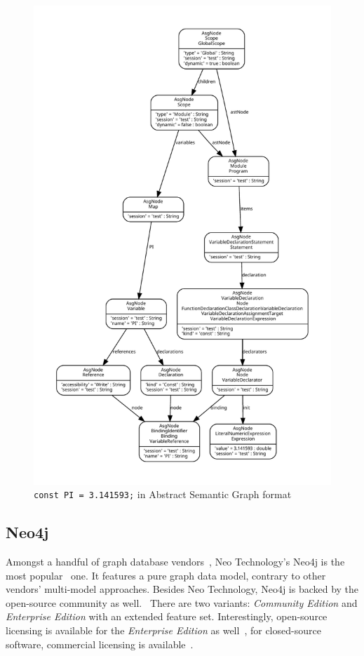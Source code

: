 \begin{figure}[!p]
	\centering
	\includegraphics[height=\textheight, trim=1cm 1cm 1cm 1cm,clip]{figures/codemodel-rifle-asg.pdf}
	\caption{\texttt{const PI = 3.141593;} in Abstract Semantic Graph format}
	\label{fig:codemodel-rifle-asg}
\end{figure}

\subsection{Neo4j}

Amongst a handful of graph database vendors~\cite{graph-dbs}, Neo Technology's Neo4j is the most popular~\cite{graph-dbs-raking} one. It features a pure graph data model, contrary to other vendors' multi-model approaches. Besides Neo Technology, Neo4j is backed by the open-source community as well.~\cite{neo4j-github} There are two variants: \emph{Community Edition} and \emph{Enterprise Edition} with an extended feature set. Interestingly, open-source licensing is available for the \emph{Enterprise Edition} as well~\cite{neo4j-opensource}, for closed-source software, commercial licensing is available~\cite{neo4j-licensing}.

